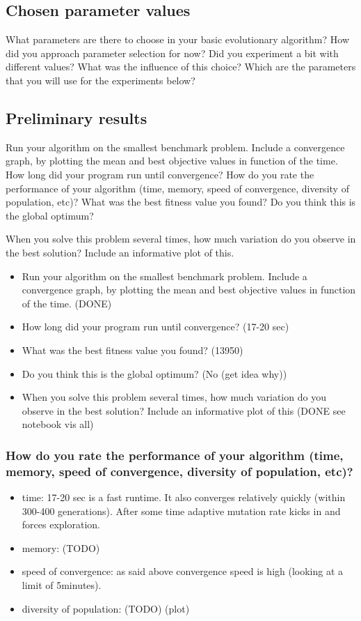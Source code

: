 \documentclass[a4paper,10pt]{article}
\newcommand{\ReplaceMe}[1]{{\color{blue}#1}}
\begin{document}
\subsection{Chosen parameter values}

\ReplaceMe{What parameters are there to choose in your basic evolutionary algorithm? How did you approach parameter selection for now? Did you experiment a bit with different values? What was the influence of this choice? Which are the parameters that you will use for the experiments below?}

\subsection{Preliminary results}

\ReplaceMe{Run your algorithm on the smallest benchmark problem. Include a convergence graph, by plotting the mean and best objective values in function of the time. How long did your program run until convergence? How do you rate the performance of your algorithm (time, memory, speed of convergence, diversity of population, etc)? What was the best fitness value you found? Do you think this is the global optimum? 

When you solve this problem several times, how much variation do you observe in the best solution? Include an informative plot of this.}

\begin{itemize}
    \item Run your algorithm on the smallest benchmark problem. Include a convergence graph, by plotting the mean and
best objective values in function of the time. (DONE)
    \item How long did your program run until convergence? (17-20 sec)
    \item What was the best fitness value you found? (13950)
    \item Do you think this is the global optimum? (No (get idea why))
    \item When you solve this problem several times, how much variation do you observe in the best solution? Include an
    informative plot of this (DONE see notebook vis all)
\end{itemize}

\subsubsection{How do you rate the performance of your algorithm (time, memory, speed of convergence, diversity of population, etc)?}
\begin{itemize}
    \item time: 17-20 sec is a fast runtime. It also converges relatively quickly (within 300-400 generations). After some time adaptive mutation rate kicks in and forces exploration.
    \item memory: (TODO)
    \item speed of convergence: as said above convergence speed is high (looking at a limit of 5minutes). 
    \item diversity of population: (TODO) (plot)
\end{itemize}
\end{document}
